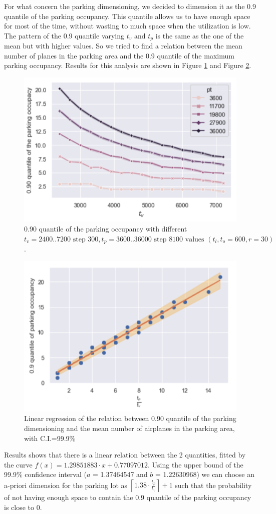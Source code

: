 \documentclass[12pt]{article}
\begin{document}
For what concern the parking dimensioning, we decided to dimension it as the 0.9 quantile of the parking occupancy. This quantile allows us to have enough space for most of the time, without wasting to much space when the utilization is low. The pattern of the 0.9 quantile varying $t_v \text{ and } t_p$ is the same as the one of the mean but with higher values. So we tried to find a relation between the mean number of planes in the parking area and the 0.9 quantile of the maximum parking occupancy. Results for this analysis are shown in Figure \ref{quantile} and Figure \ref{relation_mean_quantile}.

\begin{figure}[]
	\centering
	\includegraphics[width=.8\textwidth]{report/immagini/quantile}
	\caption{0.90 quantile of the parking occupancy with different $t_v = 2400..7200 \text{ step } 300, t_p = 3600..36000 \text{ step } 8100 \text{ values } (t_l, t_o = 600, r = 30)$.}
	\label{quantile}
\end{figure}

\begin{figure}[]
	\centering
	\includegraphics[width=.8\textwidth]{report/immagini/mean_quantile}
	\caption{Linear regression of the relation between 0.90 quantile of the parking dimensioning and the mean number of airplanes in the parking area, with C.I.=99.9\%}
	\label{relation_mean_quantile}
\end{figure}

Results shows that there is a linear relation between the 2 quantities, fitted by the curve $f(x) = 1.29851883 \cdot x + 0.77097012$. Using the upper bound of the 99.9\% confidence interval ($a$ = 1.37464547 and $b$ = 1.22630968) we can choose an a-priori dimension for the parking lot as $\left\lceil1.38 \cdot \frac{t_p}{t_v}\right\rceil+1$ such that the probability of not having enough space to contain the 0.9 quantile of the parking occupancy is close to 0.
\end{document}
